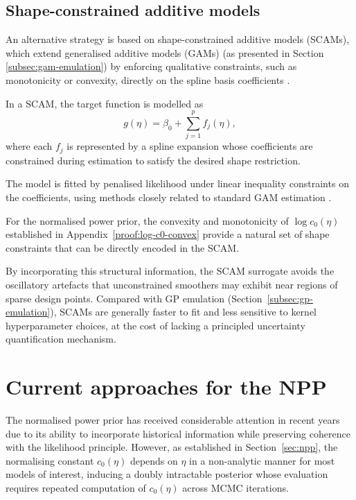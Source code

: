 \subsection{Shape-constrained additive models}
\label{subsec:scam-emulation}

An alternative strategy is based on shape-constrained additive models (SCAMs), which extend generalised additive models (GAMs) (as presented in Section \ref{subsec:gam-emulation}) by enforcing qualitative constraints, such as monotonicity or convexity, directly on the spline basis coefficients \cite{pya2015}.

In a SCAM, the target function is modelled as
\begin{equation}
    g(\eta) = \beta_0 + \sum_{j=1}^p f_j(\eta),
\end{equation}
where each $f_j$ is represented by a spline expansion whose coefficients are constrained during estimation to satisfy the desired shape restriction.

The model is fitted by penalised likelihood under linear inequality constraints on the coefficients, using methods closely related to standard GAM estimation \cite{wood2017}.

For the normalised power prior, the convexity and monotonicity of $\log c_0(\eta)$ established in Appendix~\ref{proof:log-c0-convex} provide a natural set of shape constraints that can be directly encoded in the SCAM.

By incorporating this structural information, the SCAM surrogate avoids the oscillatory artefacts that unconstrained smoothers may exhibit near regions of sparse design points.
Compared with GP emulation (Section~\ref{subsec:gp-emulation}), SCAMs are generally faster to fit and less sensitive to kernel hyperparameter choices, at the cost of lacking a principled uncertainty quantification mechanism.

\section{Current approaches for the NPP}

The normalised power prior has received considerable attention in recent years due to its ability to incorporate historical information while preserving coherence with the likelihood principle.
However, as established in Section~\ref{sec:npp}, the normalising constant $c_0(\eta)$ depends on $\eta$ in a non-analytic manner for most models of interest, inducing a doubly intractable posterior whose evaluation requires repeated computation of $c_0(\eta)$ across MCMC iterations.

